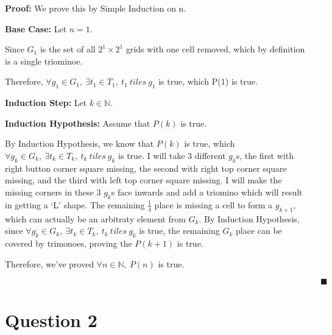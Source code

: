 \documentclass[12pt]{article}
\begin{document}
\begin{enumerate}[label=(\alph*)]
    \textbf{Proof:} We prove this by Simple Induction on n.


    \textbf{Base Case:} Let $n = 1$.

    Since $G_1$ is the set of all $2^1 \times 2^1$ grids with one cell removed, which by definition is a single triominoe.
    
    Therefore, $\forall g_1 \in G_1,\ \exists t_1 \in T_1,\ t_1\ tiles\ g_1$ is true, which P(1) is true.

    \textbf{Induction Step:} Let $k \in \mathbb{N}$.
    
    \textbf{Induction Hypothesis:} Assume that $P(k)$ is true.

    By Induction Hypothesis, we know that $P(k)$ is true, which $\forall g_k \in G_k,\ \exists t_k \in T_k,\ t_k\ tiles\ g_k $ is true.
    I will take 3 different $g_k$s, the first with right button corner square missing, the second with right top corner square missing, and the third with left top corner square missing.
    I will make the missing corners in these 3 $g_k$s face inwards and add a triomino which will result in getting a `L' shape.
    The remaining $\frac{1}{4}$ place is missing a cell to form a $g_{k+1}$, which can actually be an arbitraty element from $G_k$.
    By Induction Hypothesis, since $\forall g_k \in G_k,\ \exists t_k \in T_k,\ t_k\ tiles\ g_k $ is true, the remaining $G_k$ place can be covered by trimonoes, proving the $P(k+1)$ is true.

    Therefore, we've proved $\forall n \in \mathbb{N},\ P(n)$ is true. 

    $\quad \quad \quad \quad \quad \quad \quad \quad \quad \quad \quad \quad \quad \quad \quad \quad \quad \quad \quad \quad \quad \quad \quad \quad \quad \quad \quad \quad \quad \quad \quad \quad \quad \quad \quad \quad \quad \blacksquare $
\end{enumerate}

\newpage

\section*{Question 2}
\end{document}
